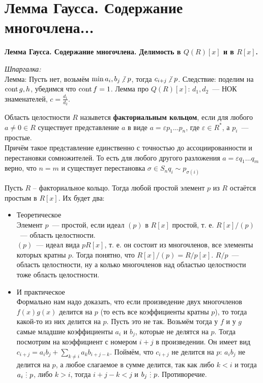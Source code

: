 \section{
 Лемма Гаусса. Содержание многочлена... %
}

\textbf{Лемма Гаусса. Содержание многочлена. Делимость в $Q(R)[x]$ и в $R[x]$.}

{\it Шпаргалка:}\\
Лемма: Пусть нет, возьмём $\min a_i, b_j \ndi p$, тогда $c_{i + j} \ndi p$. Следствие: поделим на $\operatorname{cont} g, h$, убедимся что $\operatorname{cont} f = 1$. Лемма про $Q(R)[x]$: $d_1, d_2$~--- НОК знаменателей, $c = \frac{d_1}{d_2}$.

\dfn
Область целостности $R$ назывется {\bf факториальным кольцом}, если для любого $a \neq 0 \in R$ существует представление $a$ в виде $a = \varepsilon p_1 \dots p_n$, где $\varepsilon \in R^*$, а $p_i$~--- простые.\\
Причём такое представление единственно с точностью до ассоциированности и перестановки
сомножителей. То есть для любого другого разложения $a = \varepsilon q_1 \dots q_m$ верно, что $n = m$ и существует перестановка $\sigma \in S_n q_i \sim p_{\sigma(i)}$
\edfn

\lm[Гаусс] Пусть $R$ -- факториальное кольцо. Тогда любой простой элемент $p$ из $R$ остаётся простым в $R[x]$.
\proof
Их будет два:
\begin{itemize}
	\item Теоретическое\\
	Элемент $p$~--- простой, если идеал $(p)$ в $R[x]$ простой, т. е. $R[x]/(p)$~--- область целостности.\\
	$(p)$~--- идеал вида $pR[x]$, т. е. он состоит из многочленов, все элементы которых кратны $p$. Тогда понятно, что $R[x]/(p) = R/p[x]$. $R/p$~--- область целостности, ну а колько многочленов над областью целостности тоже область целостности.
	\item И практическое\\
	Формально нам надо доказать, что если произведение двух многочленов $f(x)g(x)$ делится на $p$ (то есть все коэффициенты кратны $p$), то тогда какой-то из них делится на $p$. Пусть это не так. Возьмём тогда у $f$ и у $g$ самые младшие коэффициенты $a_i$ и  $b_j$, которые не делятся на $p$. Тогда посмотрим на коэффициент с номером $i+j$  в произведении. Он имеет вид $c_{i+j}= a_ib_j + \sum_{k \neq i} a_k b_{i+j -k}$. Поймём, что $c_{i+j}$ не делится на $p$: $a_i b_j$ не делится на $p$, а любое слагаемое в сумме делится, так как либо $k<i$ и тогда $a_i \di p$, либо $k>i$, тогда $i+j-k<j$ и $b_j \di p$. Противоречие.   
\end{itemize}
\endproof
\elm

